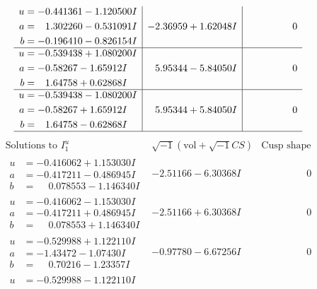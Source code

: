\documentclass[1p]{elsarticle_modified}
\theoremstyle{definition}
\newcommand{\I}{\sqrt{-1}}
\begin{document}
$$\begin{array}{c|c|c}
\begin{aligned}
u &= -0.441361 - 1.120500 I \\
a &= \phantom{-}1.302260 - 0.531091 I \\
b &= -0.196410 - 0.826154 I\end{aligned}
 & -2.36959 + 1.62048 I & \phantom{-0.000000 } 0 \\ \hline\begin{aligned}
u &= -0.539438 + 1.080200 I \\
a &= -0.58267 - 1.65912 I \\
b &= \phantom{-}1.64758 + 0.62868 I\end{aligned}
 & \phantom{-}5.95344 - 5.84050 I & \phantom{-0.000000 } 0 \\ \hline\begin{aligned}
u &= -0.539438 - 1.080200 I \\
a &= -0.58267 + 1.65912 I \\
b &= \phantom{-}1.64758 - 0.62868 I\end{aligned}
 & \phantom{-}5.95344 + 5.84050 I & \phantom{-0.000000 } 0\\
 \hline 
 \end{array}$$\newpage$$\begin{array}{c|c|c}  
\text{Solutions to }I^u_{1}& \I (\text{vol} + \sqrt{-1}CS) & \text{Cusp shape}\\
 \hline 
\begin{aligned}
u &= -0.416062 + 1.153030 I \\
a &= -0.417211 - 0.486945 I \\
b &= \phantom{-}0.078553 - 1.146340 I\end{aligned}
 & -2.51166 - 6.30368 I & \phantom{-0.000000 } 0 \\ \hline\begin{aligned}
u &= -0.416062 - 1.153030 I \\
a &= -0.417211 + 0.486945 I \\
b &= \phantom{-}0.078553 + 1.146340 I\end{aligned}
 & -2.51166 + 6.30368 I & \phantom{-0.000000 } 0 \\ \hline\begin{aligned}
u &= -0.529988 + 1.122110 I \\
a &= -1.43472 - 1.07430 I \\
b &= \phantom{-}0.70216 - 1.23357 I\end{aligned}
 & -0.97780 - 6.67256 I & \phantom{-0.000000 } 0 \\ \hline\begin{aligned}
u &= -0.529988 - 1.122110 I \\

\end{aligned}
\end{array}$$
\end{document}
